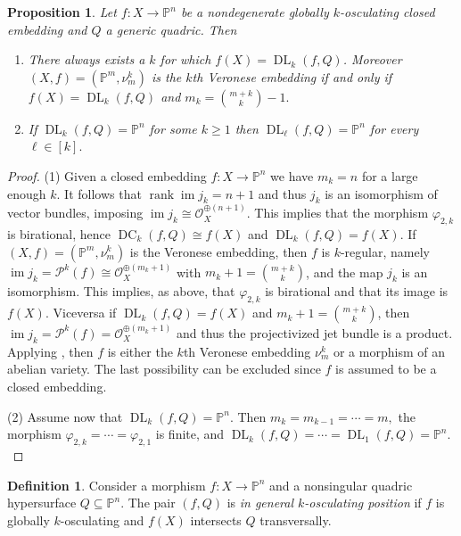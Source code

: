 \documentclass[11pt,reqno]{amsart}
\numberwithin{equation}{section}
\theoremstyle{plain}
\numberwithin{theorem}{section}
\newtheorem{proposition}[theorem]{Proposition}
\theoremstyle{definition}
\newtheorem{definition}[theorem]{Definition}
\renewcommand{\P}{\mathbb{P}}
\newcommand{\OO}{\mathcal{O}}
\newcommand{\PP}{\mathcal{P}}
\newcommand{\DC}{\operatorname{DC}}
\newcommand{\DL}{\operatorname{DL}}
\newcommand{\rank}{\operatorname{rank}}
\newcommand{\image}{\operatorname{im}}
\begin{document}
\begin{proposition}\label{prop: linearly normal}
Let $f\colon X\to\P^n$ be a nondegenerate globally $k$-osculating closed embedding and $Q$ a generic quadric. Then
\begin{enumerate}
    \item  There always exists a $k$ for which $f(X)=\DL_k(f,Q)$. Moreover $(X,f)=(\P^m,\nu_m^k)$ is the $k$th Veronese embedding if and only if $f(X)=\DL_k(f,Q)$ and $m_k=\binom{m+k}{k}-1.$
    \item If $\DL_k(f,Q)=\P^n$ for some $k\ge 1$ then $\DL_\ell(f,Q)=\P^n$ for every $\ell\in[k].$
\end{enumerate}
\end{proposition}
\begin{proof}
(1) Given a closed embedding $f\colon X\to\P^n$ we have $m_k=n$ for a large enough $k.$  It follows that $\rank\image j_k=n+1$ and thus $j_k$ is an isomorphism of vector bundles, imposing $\image j_k\cong\OO_X^{\oplus(n+1)}.$ This implies that the morphism $\varphi_{2,k}$ is birational, hence $\DC_k(f,Q)\cong f(X)$ and $\DL_k(f,Q)=f(X).$
If $(X,f)=(\P^m,\nu_m^k)$ is the Veronese embedding, then $f$ is $k$-regular, namely $\image j_k=\PP^k(f)\cong\OO_X^{\oplus(m_k+1)}$ with $m_k+1=\binom{m+k}{k}$, and the map $j_k$ is an isomorphism. This implies, as above, that $\varphi_{2,k}$ is birational and that its image is $f(X)$. Viceversa if $\DL_k(f,Q)=f(X)$ and $m_k+1=\binom{m+k}{k}$, then $\image j_k=\PP^k(f)=\OO_X^{\oplus(m_k+1)}$ and thus the projectivized jet bundle is a product. Applying \cite[Theorem 3.1]{dirocco2001line}, then $f$ is either the $k$th Veronese embedding $\nu_m^k$ or a morphism of an abelian variety. The last possibility can be excluded since $f$ is assumed to be a closed embedding.

(2) Assume now that $\DL_k(f,Q)=\P^n$. Then $m_k=m_{k-1}=\cdots =m,$ the morphism $\varphi_{2,k}=\cdots =\varphi_{2,1}$ is finite, and $\DL_k(f,Q)=\cdots = \DL_1(f,Q)=\P^n.$  
\end{proof}

\begin{definition}\label{def: general k osculating position}
Consider a morphism $f\colon X\to\P^n$ and a nonsingular quadric hypersurface $Q\subseteq\P^n$. The pair $(f,Q)$ is {\em in general $k$-osculating position} if $f$ is globally $k$-osculating and $f(X)$ intersects $Q$ transversally.
\end{definition}
 
\end{document}
